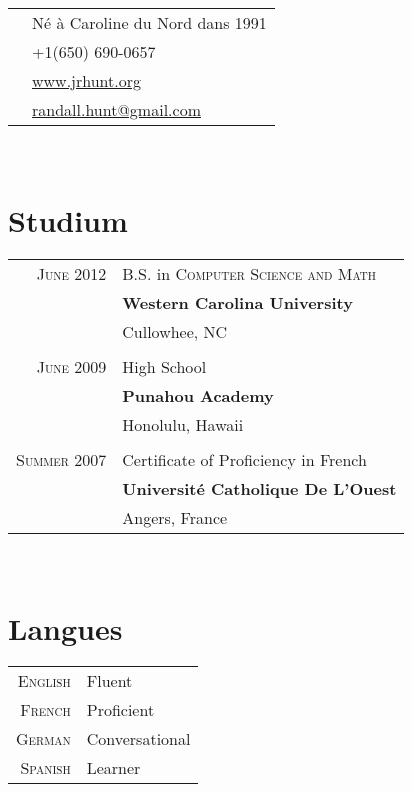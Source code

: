 \documentclass[10pt]{article}
\begin{document}
\hfill
\begin{minipage}[t]{0.44\textwidth} %

   \vspace{0pt} %

\colorbox{shade}{\textcolor{text1}{
      \begin{tabular}{c|p{7cm}}
                                    & Né à Caroline du Nord dans 1991\\
         \raisebox{-3pt}{\Phone}    &+1(650) 690-0657\\
         \raisebox{-1pt}{\textsc{www}} &\href{http://www.jrhunt.org/}{www.jrhunt.org}\\
         \raisebox{-3pt}{\Envelope} &\href{mailto:randall.hunt@gmail.com}{randall.hunt@gmail.com}
      \end{tabular}
}
}\\[3pt]
\section{Studium}

\begin{tabular}{rl}

   \textsc{June} 2012 & B.S. in \textsc{Computer Science and Math}\\
      & \textbf{Western Carolina University}\\
      & Cullowhee, NC\\
      &\\
   \textsc{June} 2009 & High School\\
      & \textbf{Punahou Academy}\\
      & Honolulu, Hawaii\\
      &\\
   \textsc{Summer} 2007 & Certificate of Proficiency in French\\
      & \textbf{Université Catholique De L'Ouest}\\
      & Angers, France\\
\end{tabular}\\[5pt]

\section{Langues}

\begin{tabular}{rl}
   \textsc{English}  &  Fluent\\
   \textsc{French}   &  Proficient\\
   \textsc{German}   &  Conversational\\
   \textsc{Spanish}  &  Learner\\
\end{tabular}\\[5pt]


\end{minipage}
\end{document}
